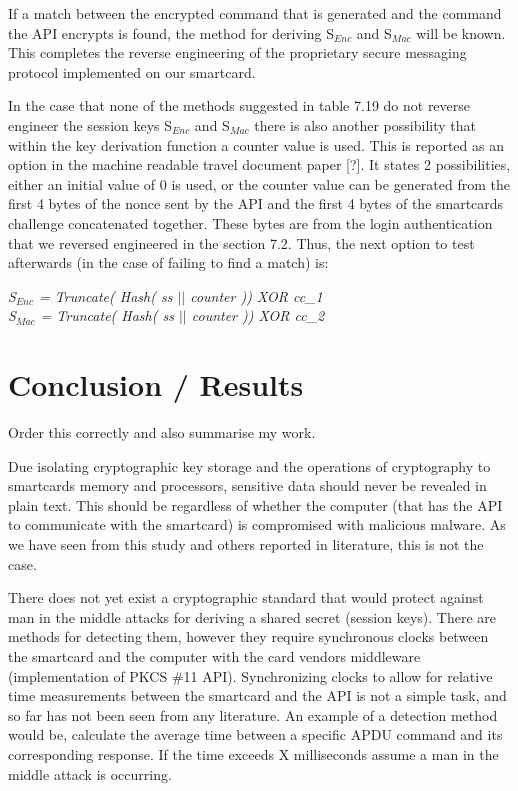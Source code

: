 \documentclass[bsc,frontabs,twoside,singlespacing,parskip,deptreport]{infthesis}     %
\begin{document}
If a match between the encrypted command that is generated and the command the API encrypts is found, the method for deriving S$_{Enc}$ and S$_{Mac}$ will be known. This completes the reverse engineering of the proprietary secure messaging protocol implemented on our smartcard. 

In the case that none of the methods suggested in table 7.19 do not reverse engineer the session keys S$_{Enc}$ and S$_{Mac}$ there is also another possibility that within the key derivation function a counter value is used. This is reported as an option in the machine readable travel document paper [?]. It states 2 possibilities, either an initial value of 0 is used, or the counter value can be generated from the first 4 bytes of the nonce sent by the API and the first 4 bytes of the smartcards challenge concatenated together. These bytes are from the login authentication that we reversed engineered in the section 7.2. Thus, the next option to test afterwards (in the case of failing to find a match) is:
\begin{center}
\textit{S$_{Enc}$ = Truncate( Hash( ss $||$ counter )) XOR cc\_1\\}
\textit{S$_{Mac}$ = Truncate( Hash( ss $||$ counter )) XOR cc\_2\\}
\end{center}

\chapter{Conclusion / Results}

Order this correctly and also summarise my work.

Due isolating cryptographic key storage and the operations of cryptography to smartcards memory and processors, sensitive data should never be revealed in plain text. This should be regardless of whether the computer (that has the API to communicate with the smartcard) is compromised with malicious malware. As we have seen from this study and others reported in literature, this is not the case.

There does not yet exist a cryptographic standard that would protect against man in the middle attacks for deriving a shared secret (session keys). There are methods for detecting them, however they require synchronous clocks between the smartcard and the computer with the card vendors middleware (implementation of PKCS \#11 API). Synchronizing clocks to allow for relative time measurements between the smartcard and the API is not a simple task, and so far has not been seen from any literature. An example of a detection method would be, calculate the average time between a specific APDU command and its corresponding response. If the time exceeds X milliseconds assume a man in the middle attack is occurring. 
\end{document}
